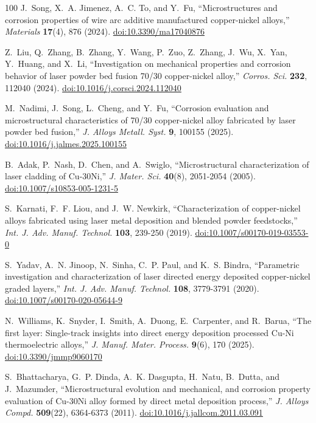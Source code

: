 \documentclass[12pt,letterpaper]{article}
\begin{document}
\begin{thebibliography}{100}
J.~Song, X.~A. Jimenez, A.~C. To, and Y.~Fu, ``Microstructures and corrosion properties of wire arc additive manufactured copper-nickel alloys,'' \emph{Materials} \textbf{17}(4), 876 (2024).
\href{https://doi.org/10.3390/ma17040876}{doi:10.3390/ma17040876}

Z.~Liu, Q.~Zhang, B.~Zhang, Y.~Wang, P.~Zuo, Z.~Zhang, J.~Wu, X.~Yan, Y.~Huang, and X.~Li, ``Investigation on mechanical properties and corrosion behavior of laser powder bed fusion 70/30 copper-nickel alloy,'' \emph{Corros. Sci.} \textbf{232}, 112040 (2024).
\href{https://doi.org/10.1016/j.corsci.2024.112040}{doi:10.1016/j.corsci.2024.112040}

M.~Nadimi, J.~Song, L.~Cheng, and Y.~Fu, ``Corrosion evaluation and microstructural characteristics of 70/30 copper-nickel alloy fabricated by laser powder bed fusion,'' \emph{J. Alloys Metall. Syst.} \textbf{9}, 100155 (2025).
\href{https://doi.org/10.1016/j.jalmes.2025.100155}{doi:10.1016/j.jalmes.2025.100155}

B.~Adak, P.~Nash, D.~Chen, and A.~Swiglo, ``Microstructural characterization of laser cladding of Cu-30Ni,'' \emph{J. Mater. Sci.} \textbf{40}(8), 2051-2054 (2005).
\href{https://doi.org/10.1007/s10853-005-1231-5}{doi:10.1007/s10853-005-1231-5}

S.~Karnati, F.~F. Liou, and J.~W. Newkirk, ``Characterization of copper-nickel alloys fabricated using laser metal deposition and blended powder feedstocks,'' \emph{Int. J. Adv. Manuf. Technol.} \textbf{103}, 239-250 (2019).
\href{https://doi.org/10.1007/s00170-019-03553-0}{doi:10.1007/s00170-019-03553-0}

S.~Yadav, A.~N. Jinoop, N.~Sinha, C.~P. Paul, and K.~S. Bindra, ``Parametric investigation and characterization of laser directed energy deposited copper-nickel graded layers,'' \emph{Int. J. Adv. Manuf. Technol.} \textbf{108}, 3779-3791 (2020).
\href{https://doi.org/10.1007/s00170-020-05644-9}{doi:10.1007/s00170-020-05644-9}

N.~Williams, K.~Snyder, I.~Smith, A.~Duong, E.~Carpenter, and R.~Barua, ``The first layer: Single-track insights into direct energy deposition processed Cu-Ni thermoelectric alloys,'' \emph{J. Manuf. Mater. Process.} \textbf{9}(6), 170 (2025).
\href{https://doi.org/10.3390/jmmp9060170}{doi:10.3390/jmmp9060170}

S.~Bhattacharya, G.~P. Dinda, A.~K. Dasgupta, H.~Natu, B.~Dutta, and J.~Mazumder, ``Microstructural evolution and mechanical, and corrosion property evaluation of Cu-30Ni alloy formed by direct metal deposition process,'' \emph{J. Alloys Compd.} \textbf{509}(22), 6364-6373 (2011).
\href{https://doi.org/10.1016/j.jallcom.2011.03.091}{doi:10.1016/j.jallcom.2011.03.091}


\end{thebibliography}
\end{document}
